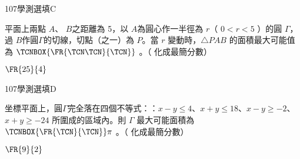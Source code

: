 \begin{QUESTIONS}
\begin{QUESTION}
\begin{ExamInfo}{107}{學測}{選填}{C}
        \end{ExamInfo}
        \begin{ExamAnsRateInfo}{}{}{}{}
        \end{ExamAnsRateInfo}
        \begin{QBODY}
            平面上兩點 $A$、 $B$之距離為 5，以 $A$為圓心作一半徑為 $r$（ $0 < r < 5$ ）的圓 $\Gamma$，過
            $B$作圓$\Gamma$的切線，切點（之一）為 $P$。當 $r$ 變動時，$\triangle PAB$ 的面積最大可能值為 $\TCNBOX{\FR{\TCN\TCN}{\TCN}}$ 。（ 化成最簡分數）
        \end{QBODY}
        \begin{QFROMS}
        \end{QFROMS}
        \begin{QTAGS}\end{QTAGS}
        \begin{QANS}
            $\FR{25}{4}$
        \end{QANS}
        \begin{QSOLLIST}
        \end{QSOLLIST}
        \begin{QEMPTYSPACE}
        \end{QEMPTYSPACE}
    \end{QUESTION}
    \begin{QUESTION}
        \begin{ExamInfo}{107}{學測}{選填}{D}
        \end{ExamInfo}
        \begin{ExamAnsRateInfo}{}{}{}{}
        \end{ExamAnsRateInfo}
        \begin{QBODY}
            坐標平面上，圓$\Gamma$完全落在四個不等式：：$x - y \le 4$、$x + y \le 18$、$x - y \ge -2$、$x + y \ge -24$
            所圍成的區域內。則 $\Gamma$ 最大可能面積為 $\TCNBOX{\FR{\TCN}{\TCN}} \pi$ 。（ 化成最簡分數）
        \end{QBODY}
        \begin{QFROMS}
        \end{QFROMS}
        \begin{QTAGS}\end{QTAGS}
        \begin{QANS}
            $\FR{9}{2}$
        \end{QANS}
        \begin{QSOLLIST}
        \end{QSOLLIST}
        \begin{QEMPTYSPACE}
        \end{QEMPTYSPACE}

\end{QUESTION}
\end{QUESTIONS}
